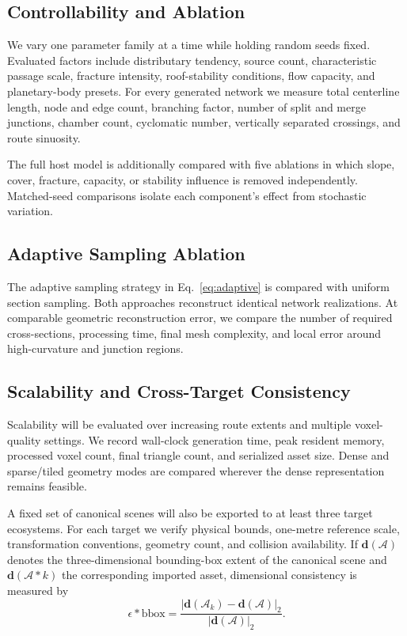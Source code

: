 \documentclass[conference]{IEEEtran}
\begin{document}
\subsection{Controllability and Ablation}

We vary one parameter family at a time while holding random seeds fixed. Evaluated factors include distributary tendency, source count, characteristic passage scale, fracture intensity, roof-stability conditions, flow capacity, and planetary-body presets. For every generated network we measure total centerline length, node and edge count, branching factor, number of split and merge junctions, chamber count, cyclomatic number, vertically separated crossings, and route sinuosity.

The full host model is additionally compared with five ablations in which slope, cover, fracture, capacity, or stability influence is removed independently. Matched-seed comparisons isolate each component's effect from stochastic variation.

\subsection{Adaptive Sampling Ablation}

The adaptive sampling strategy in Eq.~\eqref{eq:adaptive} is compared with uniform section sampling. Both approaches reconstruct identical network realizations. At comparable geometric reconstruction error, we compare the number of required cross-sections, processing time, final mesh complexity, and local error around high-curvature and junction regions.

\subsection{Scalability and Cross-Target Consistency}

Scalability will be evaluated over increasing route extents and multiple voxel-quality settings. We record wall-clock generation time, peak resident memory, processed voxel count, final triangle count, and serialized asset size. Dense and sparse/tiled geometry modes are compared wherever the dense representation remains feasible.

A fixed set of canonical scenes will also be exported to at least three target ecosystems. For each target we verify physical bounds, one-metre reference scale, transformation conventions, geometry count, and collision availability. If $\mathbf{d}(\mathcal{A})$ denotes the three-dimensional bounding-box extent of the canonical scene and $\mathbf{d}(\mathcal{A}*k)$ the corresponding imported asset, dimensional consistency is measured by
\begin{equation}
\epsilon*{\mathrm{bbox}}=\frac{\left|\mathbf{d}(\mathcal{A}_k)-\mathbf{d}(\mathcal{A})\right|_2}{\left|\mathbf{d}(\mathcal{A})\right|_2}.
\end{equation}
\end{document}

